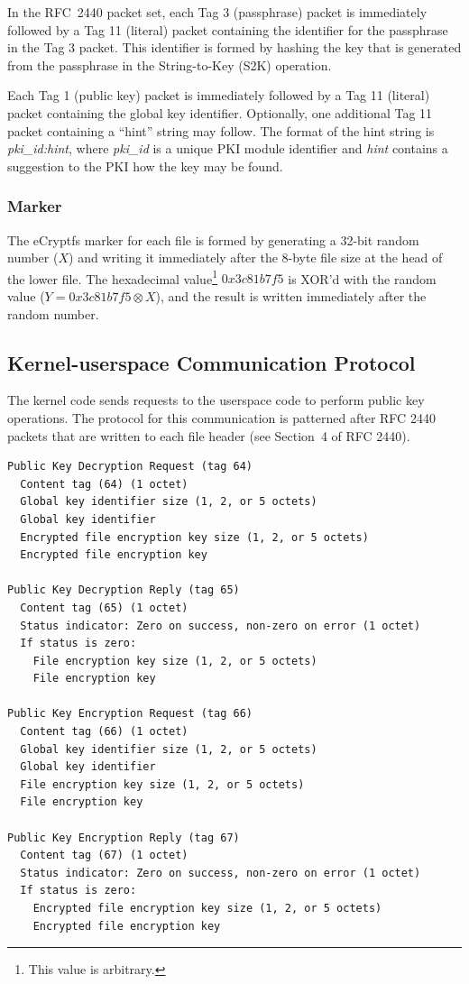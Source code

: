 \documentclass{article}
\begin{document}
In the RFC~2440 packet set, each Tag 3 (passphrase) packet is immediately
followed by a Tag 11 (literal) packet containing the identifier for the
passphrase in the Tag 3 packet. This identifier is formed by hashing the
key that is generated from the passphrase in the String-to-Key (S2K)
operation.

Each Tag 1 (public key) packet is immediately followed by a Tag 11
(literal) packet containing the global key identifier. Optionally, one
additional Tag 11 packet containing a ``hint'' string may follow. The
format of the hint string is \emph{pki\_id:hint}, where \emph{pki\_id}
is a unique PKI module identifier and \emph{hint} contains a
suggestion to the PKI how the key may be found.

\subsubsection{Marker}

The eCryptfs marker for each file is formed by generating a 32-bit
random number ($X$) and writing it immediately after the 8-byte file
size at the head of the lower file. The hexadecimal
value\footnote{This value is arbitrary.} $0x3c81b7f5$ is XOR'd with
the random value ($Y=0x3c81b7f5\otimes X$), and the result is written
immediately after the random number.

\subsection{Kernel-userspace Communication Protocol}

\label{kernel-daemon}

The kernel code sends requests to the userspace code to perform public
key operations. The protocol for this communication is patterned after
RFC 2440 packets that are written to each file header (see Section~4
of RFC 2440).

\scriptsize
\begin{verbatim}
Public Key Decryption Request (tag 64)
  Content tag (64) (1 octet)
  Global key identifier size (1, 2, or 5 octets)
  Global key identifier
  Encrypted file encryption key size (1, 2, or 5 octets)
  Encrypted file encryption key

Public Key Decryption Reply (tag 65)
  Content tag (65) (1 octet)
  Status indicator: Zero on success, non-zero on error (1 octet)
  If status is zero:
    File encryption key size (1, 2, or 5 octets)
    File encryption key

Public Key Encryption Request (tag 66)
  Content tag (66) (1 octet)
  Global key identifier size (1, 2, or 5 octets)
  Global key identifier
  File encryption key size (1, 2, or 5 octets)
  File encryption key

Public Key Encryption Reply (tag 67)
  Content tag (67) (1 octet)
  Status indicator: Zero on success, non-zero on error (1 octet)
  If status is zero:
    Encrypted file encryption key size (1, 2, or 5 octets)
    Encrypted file encryption key
\end{verbatim}
\normalsize
\end{document}
